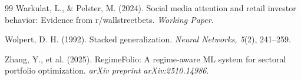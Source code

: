 \documentclass[review]{elsarticle}
\begin{document}
\begin{thebibliography}{99}
Warkulat, L., \& Pelster, M. (2024). Social media attention and retail investor behavior: Evidence from r/wallstreetbets. \emph{Working Paper}.

Wolpert, D. H. (1992). Stacked generalization. \emph{Neural Networks, 5}(2), 241--259.

Zhang, Y., et al. (2025). RegimeFolio: A regime-aware ML system for sectoral portfolio optimization. \emph{arXiv preprint arXiv:2510.14986}.

\end{thebibliography}
\end{document}

